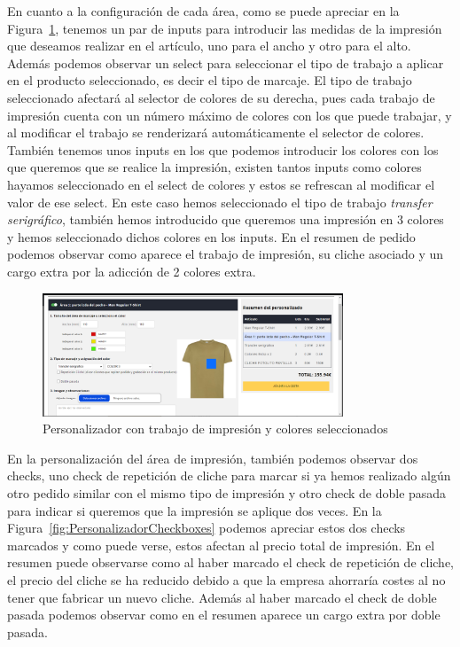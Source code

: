 \documentclass[12pt]{article}
\begin{document}
En cuanto a la configuración de cada área, como se puede apreciar en la Figura~\ref{fig:PersonalizadorColores}, tenemos un par de inputs para introducir las medidas de la impresión que deseamos 
realizar en el artículo, uno para el ancho y otro para el alto. Además podemos observar un select para seleccionar el tipo de trabajo a aplicar en el producto seleccionado, es decir el tipo de marcaje. El tipo de trabajo seleccionado
afectará al selector de colores de su derecha, pues cada trabajo de impresión cuenta con un número máximo de colores con los que puede trabajar, y al modificar el trabajo se renderizará automáticamente el selector de colores.
También tenemos unos inputs en los que podemos introducir los colores con los que queremos que se realice la impresión, existen tantos inputs como colores hayamos seleccionado en el select de colores y estos
se refrescan al modificar el valor de ese select. En este caso hemos seleccionado el tipo de trabajo \textit{transfer serigráfico}, también hemos introducido que queremos una impresión en 3 colores y hemos seleccionado dichos colores en los inputs.
En el resumen de pedido podemos observar como aparece el trabajo de impresión, su cliche asociado y un cargo extra por la adicción de 2 colores extra.

\begin{figure}[ht]
    \centering
    \includegraphics[width=0.8\textwidth]{imagenes/ManualUsuario/PersonalizadorArea1ColoresSeleccionados.png}
    \caption{\label{fig:PersonalizadorColores}Personalizador con trabajo de impresión y colores seleccionados}
    \vspace{\fill}
\end{figure}

En la personalización del área de impresión, también podemos observar dos checks, uno check de repetición de cliche para marcar si ya hemos realizado algún otro pedido similar con el mismo tipo de impresión
y otro check de doble pasada para indicar si queremos que la impresión se aplique dos veces. En la Figura~\ref{fig:PersonalizadorCheckboxes} podemos apreciar estos dos checks marcados y como puede verse, estos
afectan al precio total de impresión. En el resumen puede observarse como al haber marcado el check de repetición de cliche, el precio del cliche se ha reducido debido a que la empresa ahorraría costes al no tener que 
fabricar un nuevo cliche. Además al haber marcado el check de doble pasada podemos observar como en el resumen aparece un cargo extra por doble pasada.
\end{document}
